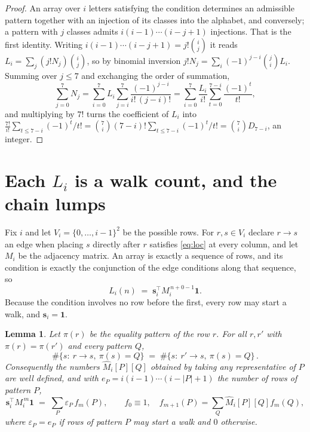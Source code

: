 \documentclass[11pt,a4paper]{article}
\theoremstyle{plain}
\newtheorem{lemma}[theorem]{Lemma}
\theoremstyle{definition}
\begin{document}
\begin{proof}
An array over $i$ letters satisfying the condition determines an admissible pattern together
with an injection of its classes into the alphabet, and conversely; a pattern with $j$
classes admits $i(i-1)\cdots(i-j+1)$ injections. That is the first identity. Writing
$i(i-1)\cdots(i-j+1)=j!\binom{i}{j}$ it reads $L_i=\sum_j (j!N_j)\binom{i}{j}$, so by
binomial inversion $j!N_j=\sum_{i}(-1)^{j-i}\binom{j}{i}L_i$. Summing over
$j\le 7$ and exchanging the order of summation,
\[
\sum_{j=0}^{7}N_j=\sum_{i=0}^{7}L_i\sum_{j=i}^{7}\frac{(-1)^{j-i}}{i!\,(j-i)!}
=\sum_{i=0}^{7}\frac{L_i}{i!}\sum_{t=0}^{7-i}\frac{(-1)^t}{t!} ,
\]
and multiplying by $7!$ turns the coefficient of $L_i$ into
$\frac{7!}{i!}\sum_{t\le 7-i}(-1)^t/t!=\binom{7}{i}(7-i)!\sum_{t\le 7-i}(-1)^t/t!
=\binom{7}{i}D_{7-i}$, an integer.
\end{proof}

\section{Each $L_i$ is a walk count, and the chain lumps}

Fix $i$ and let $V_i=\{0,\dots,i-1\}^{2}$ be the possible rows. For $r,s\in V_i$
declare $r\to s$ an edge when placing $s$ directly after $r$ satisfies \eqref{eq:loc} at
every column, and let $M_i$ be the adjacency matrix. An array is exactly a sequence of
rows, and its condition is exactly the conjunction of the edge conditions along that
sequence, so
\[
L_i(n)\;=\;\mathbf{s}_i^{\!\top}M_i^{\,n+0-1}\mathbf{1} .
\]
Because the condition involves no row before the first, every
row may start a walk, and $\mathbf{s}_i=\mathbf{1}$.

\begin{lemma}\label{lem:lump}
Let $\pi(r)$ be the equality pattern of the row $r$. For all $r,r'$ with
$\pi(r)=\pi(r')$ and every pattern $Q$,
\[
\#\{s:\ r\to s,\ \pi(s)=Q\}\;=\;\#\{s:\ r'\to s,\ \pi(s)=Q\}\, .
\]
Consequently the numbers $\widehat M_i[P][Q]$ obtained by taking any representative of $P$
are well defined, and with $e_P=i(i-1)\cdots(i-|P|+1)$ the number of rows of pattern $P$,
\[
\mathbf{s}_i^{\!\top}M_i^{\,m}\mathbf{1}\;=\;\sum_P \varepsilon_P\,f_m(P),
\qquad f_0\equiv1,\quad f_{m+1}(P)=\sum_Q\widehat M_i[P][Q]f_m(Q),
\]
where $\varepsilon_P=e_P$ if rows of pattern $P$ may start a walk and $0$ otherwise.
\end{lemma}
\end{document}
